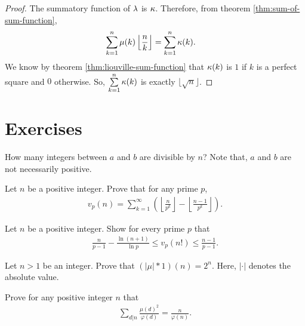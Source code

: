 \documentclass[12pt]{subfile}
\begin{document}
		\begin{proof}
			The summatory function of $\lambda$ is $\kappa$. Therefore, from theorem \eqref{thm:sum-of-sum-function},
				\begin{align*}
					\sum_{k=1}^{n} \mu(k) \left\lfloor \frac{n}{k}\right\rfloor &= \sum_{k=1}^{n} \kappa(k).
				\end{align*}
			We know by theorem \eqref{thm:liouville-sum-function} that $\kappa(k)$ is $1$ if $k$ is a perfect square and $0$ otherwise. So, $\sum\limits_{k=1}^{n} \kappa(k)$ is exactly $\lfloor \sqrt n \rfloor$.
		\end{proof}
\newpage	
\section{Exercises}

	\begin{problem}
		How many integers between $a$ and $b$ are divisible by $n$? Note that, $a$ and $b$ are not necessarily positive.
	\end{problem}
	
	\begin{problem}
		Let $n$ be a positive integer. Prove that for any prime $p$,
			\begin{align*}
				v_p(n)= \sum_{k=1}^{\infty} \left(\left\lfloor \frac{n}{p^k}\right\rfloor - \left\lfloor \frac{n-1}{p^k}\right\rfloor\right).
			\end{align*}
	\end{problem}

	\begin{problem}
		Let $n$ be a positive integer. Show for every prime $p$ that
			\begin{align*}
				\frac{n}{p-1} - \frac{\ln(n+1)}{\ln p} \leq v_p(n!) \leq \frac{n-1}{p-1}.
			\end{align*}
	\end{problem}

	\begin{problem}
		Let $n>1$ be an integer. Prove that $(|\mu|\ast 1)(n)=2^n$. Here, $|\cdot|$ denotes the absolute value.
	\end{problem}
	
	\begin{problem}
		Prove for any positive integer $n$ that
			\begin{align*}
				\sum_{d|n} \frac{\mu(d)^2}{\varphi(d)} = \frac{n}{\varphi(n)}.
			\end{align*}
	\end{problem}
	
\end{document}
